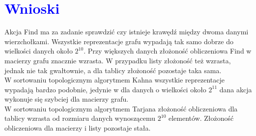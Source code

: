 \documentclass{article}
\begin{document}
	\section*{\textcolor{blue}{Wnioski}}
	\noindent Akcja Find ma za zadanie sprawdzić czy istnieje krawędź między dwoma danymi wierzchołkami. Wszystkie reprezentacje grafu wypadają tak samo dobrze do wielkości danych około $2^{10}$. Przy większych danych złożoność obliczeniowa Find w macierzy grafu znacznie wzrasta. W przypadku listy złożoność też wzrasta, jednak nie tak gwałtownie, a dla tablicy złożoność pozostaje taka sama.
	\\ W sortowaniu topologicznym algorytmem Kahna wszystkie reprezentacje wypadają bardzo podobnie, jedynie w dla danych o wielkości około $2^{11}$ dana akcja wykonuje się szybciej dla macierzy grafu.
	\\ W sortowaniu topologicznym algorytmem Tarjana złożoność obliczeniowa dla tablicy wzrasta od rozmiaru danych wynoszącemu $2^{10}$ elementów. Złożoność obliczeniowa dla macierzy i listy pozostaje stała.
	
\end{document}

